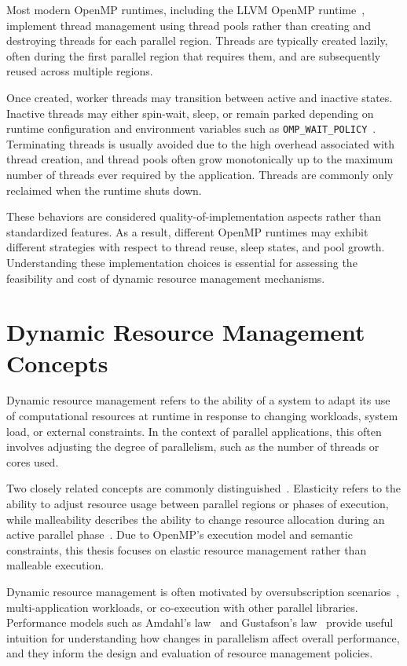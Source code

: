 Most modern OpenMP runtimes, including the LLVM OpenMP runtime~\parencite{noauthor_welcome_nodate}, implement thread management using thread pools rather than creating and destroying threads for each parallel region. Threads are typically created lazily, often during the first parallel region that requires them, and are subsequently reused across multiple regions.

Once created, worker threads may transition between active and inactive states. Inactive threads may either spin-wait, sleep, or remain parked depending on runtime configuration and environment variables such as \texttt{OMP\_WAIT\_POLICY}~\parencite{openmp60}. Terminating threads is usually avoided due to the high overhead associated with thread creation, and thread pools often grow monotonically up to the maximum number of threads ever required by the application. Threads are commonly only reclaimed when the runtime shuts down.

These behaviors are considered quality-of-implementation aspects rather than standardized features. As a result, different OpenMP runtimes may exhibit different strategies with respect to thread reuse, sleep states, and pool growth. Understanding these implementation choices is essential for assessing the feasibility and cost of dynamic resource management mechanisms.

\section{Dynamic Resource Management Concepts}

Dynamic resource management refers to the ability of a system to adapt its use of computational resources at runtime in response to changing workloads, system load, or external constraints. In the context of parallel applications, this often involves adjusting the degree of parallelism, such as the number of threads or cores used.

Two closely related concepts are commonly distinguished~\parencite{Feitelson1996}. Elasticity refers to the ability to adjust resource usage between parallel regions or phases of execution, while malleability describes the ability to change resource allocation during an active parallel phase~\parencite{Aliaga2022survey}. Due to OpenMP's execution model and semantic constraints, this thesis focuses on elastic resource management rather than malleable execution.

Dynamic resource management is often motivated by oversubscription scenarios~\parencite{iancu2010oversubscription}, multi-application workloads, or co-execution with other parallel libraries. Performance models such as Amdahl's law~\parencite{Amdahl1967} and Gustafson's law~\parencite{Gustafson1988} provide useful intuition for understanding how changes in parallelism affect overall performance, and they inform the design and evaluation of resource management policies.

